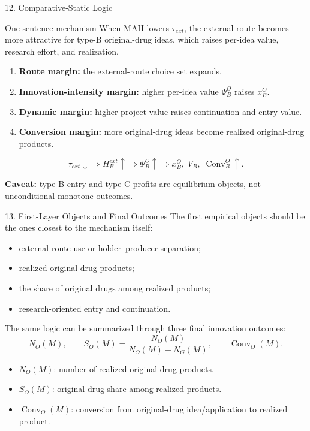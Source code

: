 \documentclass[aspectratio=169,11pt]{beamer}
\begin{document}
\begin{frame}{12. Comparative-Static Logic}
\small
\begin{block}{One-sentence mechanism}
When MAH lowers \(\tau_{ext}\), the external route becomes more attractive for type-B original-drug ideas, which raises per-idea value, research effort, and realization.
\end{block}

\begin{enumerate}
\item \textbf{Route margin:} the external-route choice set expands.
\item \textbf{Innovation-intensity margin:} higher per-idea value \(\Psi_B^O\) raises \(x_B^O\).
\item \textbf{Dynamic margin:} higher project value raises continuation and entry value.
\item \textbf{Conversion margin:} more original-drug ideas become realized original-drug products.
\end{enumerate}

\vspace{0.1cm}
\[
\tau_{ext}\downarrow
\Rightarrow
H_B^{ext}\uparrow
\Rightarrow
\Psi_B^O\uparrow
\Rightarrow
x_B^O,\;V_B,\;\operatorname{Conv}_B^O\uparrow.
\]

\vspace{0.05cm}
\textbf{Caveat:} type-B entry and type-C profits are equilibrium objects, not unconditional monotone outcomes.
\end{frame}

\begin{frame}{13. First-Layer Objects and Final Outcomes}
\small
The first empirical objects should be the ones closest to the mechanism itself:

\begin{itemize}
\item external-route use or holder--producer separation;
\item realized original-drug products;
\item the share of original drugs among realized products;
\item research-oriented entry and continuation.
\end{itemize}

\vspace{0.05cm}
The same logic can be summarized through three final innovation outcomes:
\[
N_O(M),\qquad
S_O(M)=\frac{N_O(M)}{N_O(M)+N_G(M)},\qquad
\operatorname{Conv}_O(M).
\]

\begin{itemize}
\item \(N_O(M)\): number of realized original-drug products.
\item \(S_O(M)\): original-drug share among realized products.
\item \(\operatorname{Conv}_O(M)\): conversion from original-drug idea/application to realized product.
\end{itemize}
\end{frame}
\end{document}
